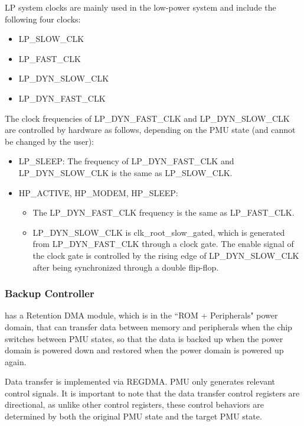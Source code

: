 \documentclass[main\_\_EN.tex]{subfiles}
\begin{document}
LP system clocks are mainly used in the low-power system and include the following four clocks:

    \begin{itemize}
    \item LP\_SLOW\_CLK
    \item LP\_FAST\_CLK
    \item LP\_DYN\_SLOW\_CLK
    \item LP\_DYN\_FAST\_CLK
    \end{itemize}

The clock frequencies of LP\_DYN\_FAST\_CLK and LP\_DYN\_SLOW\_CLK are controlled by hardware as follows, depending on the PMU state (and cannot be changed by the user):

    \begin{itemize}
    \item LP\_SLEEP: The frequency of LP\_DYN\_FAST\_CLK and LP\_DYN\_SLOW\_CLK is the same as LP\_SLOW\_CLK.
    \item HP\_ACTIVE, HP\_MODEM, HP\_SLEEP:
    \begin{itemize}
        \item The LP\_DYN\_FAST\_CLK frequency is the same as LP\_FAST\_CLK.
        \item LP\_DYN\_SLOW\_CLK is clk\_root\_slow\_gated, which is generated from LP\_DYN\_FAST\_CLK through a clock gate. The enable signal of the clock gate is controlled by the rising edge of LP\_DYN\_SLOW\_CLK after being synchronized through a double flip-flop.
    \end{itemize}
    \end{itemize}

\subsubsection{Backup Controller}

\chipname{} has a Retention DMA module, which is in the ``ROM + Peripherals" power domain, that can transfer data between memory and peripherals when the chip switches between PMU states, so that the data is backed up when the power domain is powered down and restored when the power domain is powered up again.

Data transfer is implemented via REGDMA. PMU only generates relevant control signals. It is important to note that the data transfer control registers are directional, as unlike other control registers, these control behaviors are determined by both the original PMU state and the target PMU state.
\end{document}
